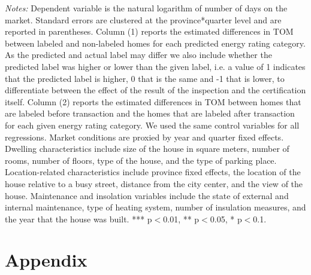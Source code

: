 \documentclass[12pt]{article}
\begin{document}
\begin{table}[H]
\begin{tabular}{lcccc}
    \end{tabular}%
\begin{tablenotes}
\scriptsize
\item \textit{Notes:} Dependent variable is the natural logarithm of number of days on the market. Standard errors are clustered at the province*quarter level and are reported in parentheses. Column (1) reports the estimated differences in TOM  between labeled and non-labeled homes for each predicted energy rating category. As the predicted and actual label may differ we also include whether the predicted label was higher or lower than the given label, i.e. a value of 1 indicates that the predicted label is higher, 0 that is the same and -1 that is lower, to differentiate between the effect of the result of the inspection and the certification itself. Column (2) reports the estimated differences in TOM  between homes that are labeled before transaction and the homes that are labeled after transaction for each given energy rating category. We used the same control variables for all regressions. Market conditions are proxied by year and quarter fixed effects. Dwelling characteristics include size of the house in square meters, number of rooms, number of floors, type of the house, and the type of parking place. Location-related characteristics include province fixed effects, the location of the house relative to a busy street, distance from the city center, and the view of the house. Maintenance and insolation variables include the state of external and internal maintenance, type of heating system, number of insulation measures, and the year that the house was built. *** p$<$0.01, ** p$<$0.05, * p$<$0.1. 
\end{tablenotes}

  \label{tab:addlabel}%
\end{table}%










\appendix
\section*{Appendix}
\end{document}
